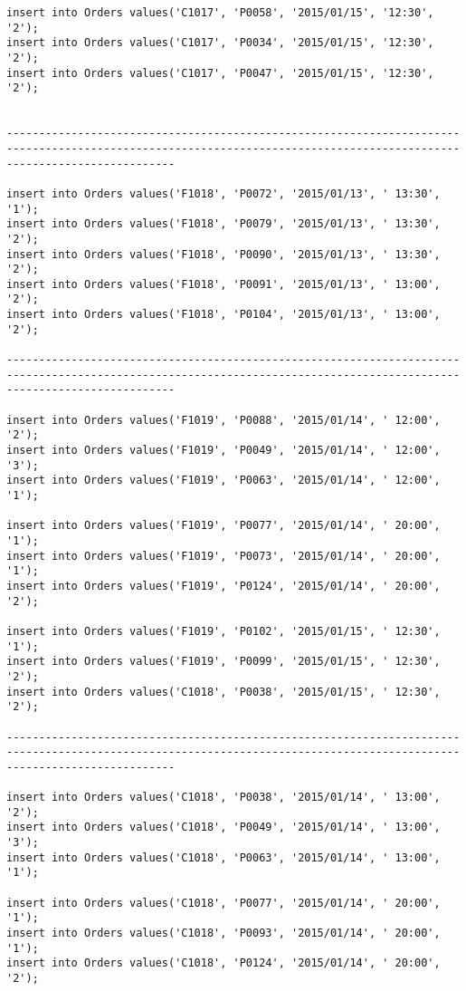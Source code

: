 \documentclass[a4,12pt]{report}
\begin{document}
\begin{lstlisting}
insert into Orders values('C1017', 'P0058', '2015/01/15', '12:30', '2');
insert into Orders values('C1017', 'P0034', '2015/01/15', '12:30', '2');
insert into Orders values('C1017', 'P0047', '2015/01/15', '12:30', '2');


----------------------------------------------------------------------------------------------------------------------------------------------------------------------

insert into Orders values('F1018', 'P0072', '2015/01/13', ' 13:30', '1');
insert into Orders values('F1018', 'P0079', '2015/01/13', ' 13:30', '2');
insert into Orders values('F1018', 'P0090', '2015/01/13', ' 13:30', '2');
insert into Orders values('F1018', 'P0091', '2015/01/13', ' 13:00', '2');
insert into Orders values('F1018', 'P0104', '2015/01/13', ' 13:00', '2');

----------------------------------------------------------------------------------------------------------------------------------------------------------------------

insert into Orders values('F1019', 'P0088', '2015/01/14', ' 12:00', '2');
insert into Orders values('F1019', 'P0049', '2015/01/14', ' 12:00', '3');
insert into Orders values('F1019', 'P0063', '2015/01/14', ' 12:00', '1');

insert into Orders values('F1019', 'P0077', '2015/01/14', ' 20:00', '1');
insert into Orders values('F1019', 'P0073', '2015/01/14', ' 20:00', '1');
insert into Orders values('F1019', 'P0124', '2015/01/14', ' 20:00', '2');

insert into Orders values('F1019', 'P0102', '2015/01/15', ' 12:30', '1');
insert into Orders values('F1019', 'P0099', '2015/01/15', ' 12:30', '2');
insert into Orders values('C1018', 'P0038', '2015/01/15', ' 12:30', '2');

----------------------------------------------------------------------------------------------------------------------------------------------------------------------

insert into Orders values('C1018', 'P0038', '2015/01/14', ' 13:00', '2');
insert into Orders values('C1018', 'P0049', '2015/01/14', ' 13:00', '3');
insert into Orders values('C1018', 'P0063', '2015/01/14', ' 13:00', '1');

insert into Orders values('C1018', 'P0077', '2015/01/14', ' 20:00', '1');
insert into Orders values('C1018', 'P0093', '2015/01/14', ' 20:00', '1');
insert into Orders values('C1018', 'P0124', '2015/01/14', ' 20:00', '2');


\end{lstlisting}
\end{document}

